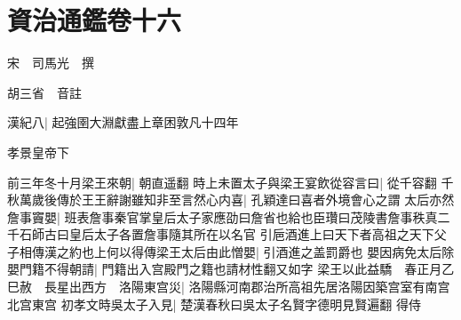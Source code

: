 \chapter{資治通鑑卷十六}
宋　司馬光　撰

胡三省　音註

漢紀八|{
	起強圉大淵獻盡上章困敦凡十四年}


孝景皇帝下

前三年冬十月梁王來朝|{
	朝直遥翻}
時上未置太子與梁王宴飲從容言曰|{
	從千容翻}
千秋萬歲後傳於王王辭謝雖知非至言然心内喜|{
	孔穎達曰喜者外境會心之謂}
太后亦然詹事竇嬰|{
	班表詹事秦官掌皇后太子家應劭曰詹省也給也臣瓚曰茂陵書詹事秩真二千石師古曰皇后太子各置詹事隨其所在以名官}
引巵酒進上曰天下者高祖之天下父子相傳漢之約也上何以得傳梁王太后由此憎嬰|{
	引酒進之盖罰爵也}
嬰因病免太后除嬰門籍不得朝請|{
	門籍出入宫殿門之籍也請材性翻又如字}
梁王以此益驕　春正月乙巳赦　長星出西方　洛陽東宫災|{
	洛陽縣河南郡治所高祖先居洛陽因築宫室有南宫北宫東宫}
初孝文時吳太子入見|{
	楚漢春秋曰吳太子名賢字德明見賢遍翻}
得侍

